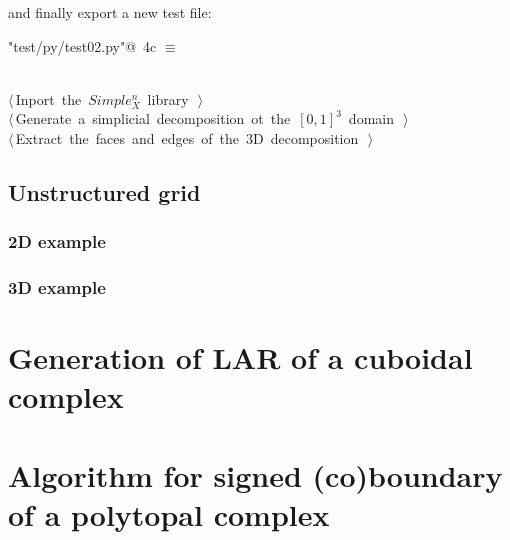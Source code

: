 \documentclass[11pt,oneside]{article}	%
\begin{document}
and finally export a new test file:

\begin{flushleft} \small \label{scrap7}
\protect{}\verb@"test/py/test02.py"@\nobreak\ {\footnotesize 4c }$\equiv$
\vspace{-1ex}
\begin{list}{}{} \item
\mbox{}\verb@@\\
\mbox{}\verb@@\hbox{$\langle\,$Inport the $Simple_X^n$ library\nobreak\ {\footnotesize {}}$\,\rangle$}\verb@@\\
\mbox{}\verb@@\hbox{$\langle\,$Generate a simplicial decomposition ot the $[0,1]^3$ domain\nobreak\ {\footnotesize {}}$\,\rangle$}\verb@@\\
\mbox{}\verb@@\hbox{$\langle\,$Extract the faces and edges of the 3D decomposition\nobreak\ {\footnotesize {}}$\,\rangle$}\verb@@\\
\mbox{}\verb@@{\NWsep}
\end{list}
\vspace{-2ex}
\end{flushleft}


\subsection{Unstructured grid}


\subsubsection{2D example}


\subsubsection{3D example}




\section{Generation of LAR of a cuboidal complex}
\label{cuboidal}

\section{Algorithm for signed (co)boundary of a polytopal complex}
\label{polytopal}
\end{document}
